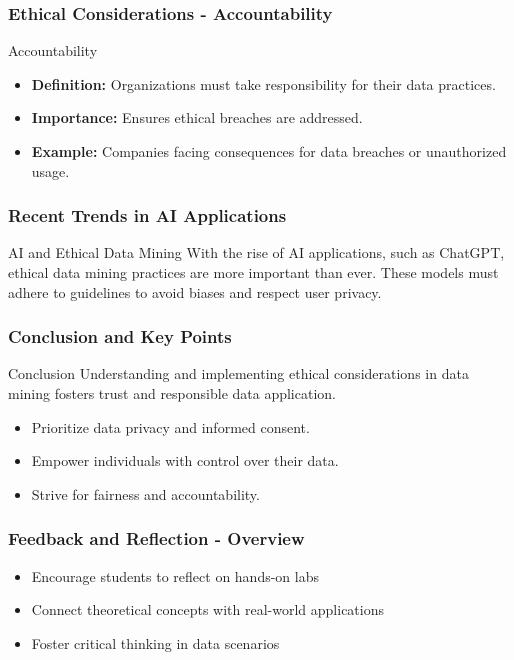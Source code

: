 \documentclass[aspectratio=169]{beamer}
\begin{document}
\begin{frame}[fragile]
    \frametitle{Ethical Considerations - Accountability}
    \begin{block}{Accountability}
        \begin{itemize}
            \item \textbf{Definition:} Organizations must take responsibility for their data practices.
            \item \textbf{Importance:} Ensures ethical breaches are addressed.
            \item \textbf{Example:} Companies facing consequences for data breaches or unauthorized usage.
        \end{itemize}
    \end{block}
\end{frame}

\begin{frame}[fragile]
    \frametitle{Recent Trends in AI Applications}
    \begin{block}{AI and Ethical Data Mining}
        With the rise of AI applications, such as ChatGPT, ethical data mining practices are more important than ever. These models must adhere to guidelines to avoid biases and respect user privacy.
    \end{block}
\end{frame}

\begin{frame}[fragile]
    \frametitle{Conclusion and Key Points}
    \begin{block}{Conclusion}
        Understanding and implementing ethical considerations in data mining fosters trust and responsible data application.
    \end{block}
    \begin{itemize}
        \item Prioritize data privacy and informed consent.
        \item Empower individuals with control over their data.
        \item Strive for fairness and accountability.
    \end{itemize}
\end{frame}

\begin{frame}[fragile]
    \frametitle{Feedback and Reflection - Overview}
    \begin{itemize}
        \item Encourage students to reflect on hands-on labs
        \item Connect theoretical concepts with real-world applications
        \item Foster critical thinking in data scenarios
    \end{itemize}
\end{frame}
\end{document}
